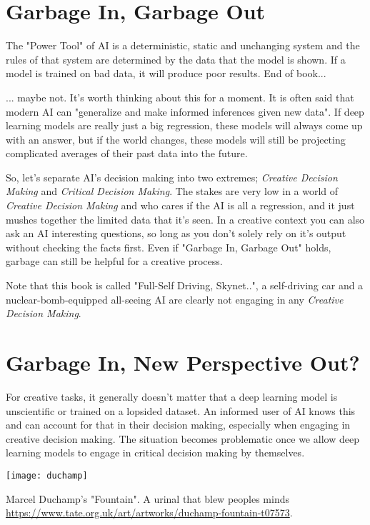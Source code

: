 \section{Garbage In, Garbage Out}

The "Power Tool" of AI is a deterministic, static and unchanging system and the rules of that system are determined by the data that the model is shown. If a model is trained on bad data, it will produce poor results. End of book...

... maybe not. It's worth thinking about this for a moment. It is often said that modern AI can "generalize and make informed inferences given new data". If deep learning models are really just a big regression, these models will always come up with an answer, but if the world changes, these models will still be projecting complicated averages of their past data into the future. 

So, let's separate AI's decision making into two extremes; \textit{Creative Decision Making} and \textit{Critical Decision Making}. The stakes are very low in a world of \textit{Creative Decision Making} and who cares if the AI is all a regression, and it just mushes together the limited data that it's seen. In a creative context you can also ask an AI interesting questions, so long as you don't solely rely on it's output without checking the facts first. Even if "Garbage In, Garbage Out" holds, garbage can still be helpful for a creative process. 

Note that this book is called "Full-Self Driving, Skynet..", a self-driving car and a nuclear-bomb-equipped all-seeing AI are clearly not engaging in any \textit{Creative Decision Making}. 

\section{Garbage In, New Perspective Out?}

For creative tasks, it generally doesn't matter that a deep learning model is unscientific or trained on a lopsided dataset. An informed user of AI knows this and can account for that in their decision making, especially when engaging in creative decision making. The situation becomes problematic once we allow deep learning models to engage in critical decision making by themselves. 

\begin{marginfigure}[-5.5cm]
        \texttt{[image: duchamp]}
        \caption{Marcel Duchamp's "Fountain". A urinal that blew peoples minds \url{https://www.tate.org.uk/art/artworks/duchamp-fountain-t07573}.}
\end{marginfigure}

